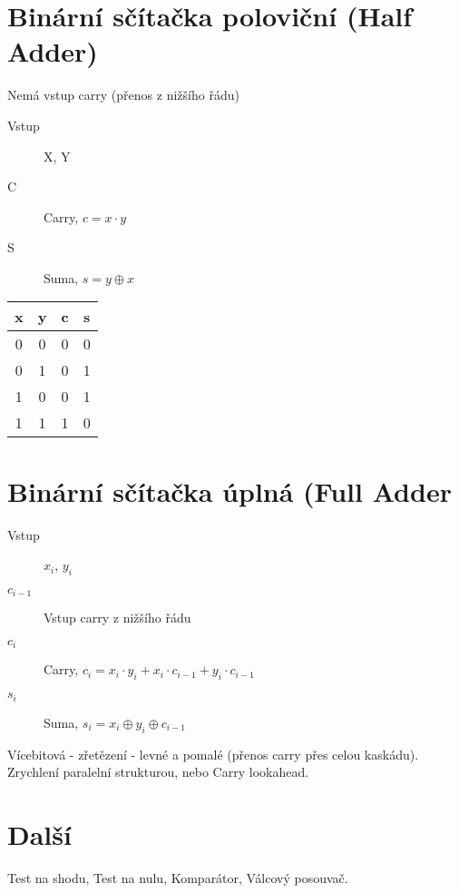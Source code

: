 \documentclass[a4paper, 11pt]{report}
\begin{document}
\section{Binární sčítačka poloviční (Half Adder)}

Nemá vstup carry (přenos z nižšího řádu)

\begin{description}
	\item[Vstup] X, Y
	\item[C] Carry, $ c = x \cdot y$
	\item[S] Suma, $ s = y \oplus x$
\end{description}

\begin{tabular}{ |c | c | c | c |}
 \hline
 x & y & c & s \\ \hline
 0 & 0 & 0 & 0 \\
 0 & 1 & 0 & 1 \\
 1 & 0 & 0 & 1 \\
 1 & 1 & 1 & 0 \\ \hline
\end{tabular}

\section{Binární sčítačka úplná (Full Adder}

\begin{description}
	\item[Vstup] $x_i$, $y_i$
	\item[$c_{i-1}$] Vstup carry z nižšího řádu
	\item[$c_i$] Carry, $ c_i = x_i \cdot y_i + x_i \cdot c_{i-1} + y_i \cdot c_{i-1}$
	\item[$s_i$] Suma, $ s_i = x_i \oplus y_i \oplus c_{i-1}$
\end{description}

Vícebitová - zřetězení - levné a pomalé (přenos carry přes celou kaskádu). Zrychlení paralelní strukturou, nebo Carry lookahead.

\section{Další}

Test na shodu, Test na nulu, Komparátor, Válcový posouvač.
\end{document}
